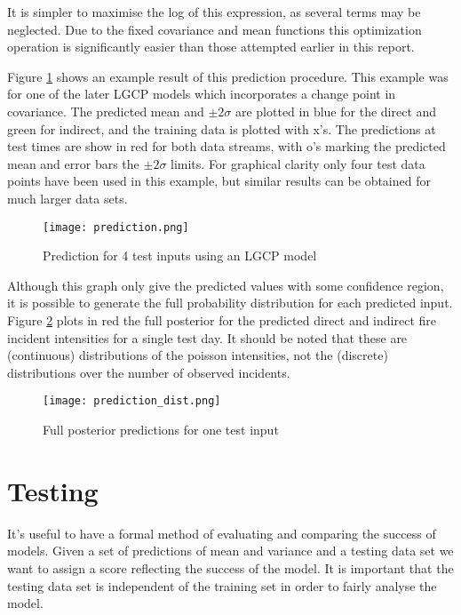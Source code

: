 \documentclass[a4paper,11pt]{report}
\begin{document}
It is simpler to maximise the log of this expression, as several terms may be neglected. Due to the fixed covariance and mean functions this optimization operation is significantly easier than those attempted earlier in this report. \par

Figure \ref{fig:inference} shows an example result of this prediction procedure. This example was for one of the later LGCP models which incorporates a change point in covariance. The predicted mean and \(\pm 2 \sigma\) are plotted in blue for the direct and green for indirect, and the training data is plotted with x's. The predictions at test times are show in red for both data streams, with o's marking the predicted mean and error bars the \(\pm 2 \sigma\) limits. For graphical clarity only four test data points have been used in this example, but similar results can be obtained for much larger data sets.

\begin{figure}[h!]
\centering
\texttt{[image: prediction.png]}
\caption{Prediction for 4 test inputs using an LGCP model}
\label{fig:inference}
\end{figure}

Although this graph only give the predicted values with some confidence region, it is possible to generate the full probability distribution for each predicted input. Figure \ref{fig:inference2} plots in red the full posterior for the predicted direct and indirect fire incident intensities for a single test day. It should be noted that these are (continuous) distributions of the poisson intensities, not the (discrete) distributions over the number of observed incidents. 

\begin{figure}[h!]
\centering
\texttt{[image: prediction\_dist.png]}
\caption{Full posterior predictions for one test input}
\label{fig:inference2}
\end{figure}

\chapter{Testing}

It's useful to have a formal method of evaluating and comparing the success of models. Given a set of predictions of mean and variance and a testing data set we want to assign a score reflecting the success of the model. It is important that the testing data set is independent of the training set in order to fairly analyse the model. \par
\end{document}
